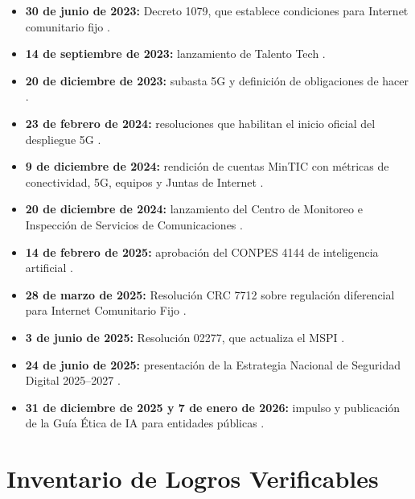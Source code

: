 \documentclass[9pt,a4paper,twoside]{rho-class/rho}
\begin{document}
\begin{itemize}
    \item \textbf{30 de junio de 2023:} Decreto 1079, que establece condiciones para Internet comunitario fijo \cite{funcionpublica_decreto_1079_2023}.
    \item \textbf{14 de septiembre de 2023:} lanzamiento de Talento Tech \cite{mintic_talento_tech_lanzamiento_2023}.
    \item \textbf{20 de diciembre de 2023:} subasta 5G y definición de obligaciones de hacer \cite{mintic_5g_realidad_2023}.
    \item \textbf{23 de febrero de 2024:} resoluciones que habilitan el inicio oficial del despliegue 5G \cite{mintic_despliegue_5g_2024}.
    \item \textbf{9 de diciembre de 2024:} rendición de cuentas MinTIC con métricas de conectividad, 5G, equipos y Juntas de Internet \cite{mintic_rendicion_cuentas_2024}.
    \item \textbf{20 de diciembre de 2024:} lanzamiento del Centro de Monitoreo e Inspección de Servicios de Comunicaciones \cite{mintic_cmic_telecomunicaciones_2024}.
    \item \textbf{14 de febrero de 2025:} aprobación del CONPES 4144 de inteligencia artificial \cite{vanegas_conpes_4144_2025}.
    \item \textbf{28 de marzo de 2025:} Resolución CRC 7712 sobre regulación diferencial para Internet Comunitario Fijo \cite{crc_resolucion_7712_2025}.
    \item \textbf{3 de junio de 2025:} Resolución 02277, que actualiza el MSPI \cite{mintic_mspi_resolucion_02277_2025}.
    \item \textbf{24 de junio de 2025:} presentación de la Estrategia Nacional de Seguridad Digital 2025--2027 \cite{mintic_seguridad_digital_2025}.
    \item \textbf{31 de diciembre de 2025 y 7 de enero de 2026:} impulso y publicación de la Guía Ética de IA para entidades públicas \cite{dnp_guia_etica_ia_2025,mintic_guia_etica_ia_2026}.
\end{itemize}

\section{Inventario de Logros Verificables}
\end{document}
